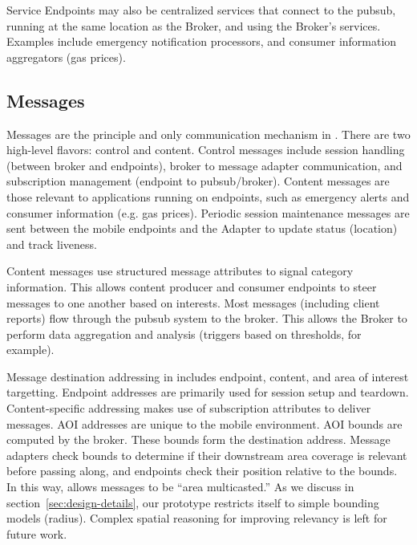 Service Endpoints may also be centralized services that connect to the
pubsub, running at the same location as the Broker, and using the
Broker's services. Examples include emergency notification processors,
and consumer information aggregators (gas prices).

\subsection{\name Messages}

Messages are the principle and only communication mechanism in
\name. There are two high-level flavors: control and
content. Control messages include session handling (between broker and
endpoints), broker to message adapter communication, and subscription
management (endpoint to pubsub/broker).  Content messages are those
relevant to applications running on endpoints, such as emergency
alerts and consumer information (e.g. gas prices).  Periodic session
maintenance messages are sent between the mobile endpoints and the
\name Adapter to update status (location) and track liveness.


Content messages use structured 
message attributes to signal category information. This allows content
producer and consumer endpoints to steer messages to one another based
on interests. Most messages (including client reports) flow through
the pubsub system to the broker. This allows the Broker to perform
data aggregation and analysis (triggers based on thresholds, for
example).

Message destination addressing in \name includes endpoint, content,
and area of interest targetting. Endpoint addresses are primarily used
for session setup and teardown. Content-specific addressing makes use
of subscription attributes to deliver messages. AOI addresses are
unique to the mobile environment. AOI bounds are computed by the
broker. These bounds form the destination address. Message adapters
check bounds to determine if their downstream area coverage is
relevant before passing along, and endpoints check their position
relative to the bounds.  In this way, \name allows messages to be
``area multicasted.''  As we discuss in
section~\ref{sec:design-details}, our prototype restricts itself to
simple bounding models (radius). Complex spatial reasoning for
improving relevancy is left for future work.

